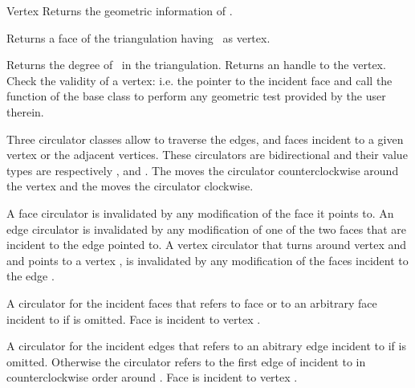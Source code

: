 \begin{ccRefClass}{Vertex}
\ccAccessFunctions
{}
{Returns  the geometric information of \ccVar.}

{Returns a face of the triangulation having  \ccVar\ as vertex.}

\begin{ccAdvanced}
\end{ccAdvanced}

{Returns the degree of \ccVar\ in the triangulation.}
\ccGlue
{}
{Returns an handle to the vertex.}
\ccGlue
{} 
{Check the validity of a vertex:
i.e. the pointer to the incident face  and call the 
function of the base class to perform any geometric test provided by the user
therein.}


Three circulator classes allow to traverse the edges, and faces
incident to a given vertex or  the adjacent vertices.
 These circulators are bidirectional
and their value types are respectively , 
and .
The   moves the circulator
counterclockwise around the vertex 
and  the  moves the circulator
clockwise. 

A face circulator is invalidated by any modification of the face it
points to. An edge circulator is invalidated
by any modification of one of the two faces that are incident to the edge
pointed to.  A vertex circulator that turns around vertex 
and and points  to a vertex , is invalidated
by any modification of the faces incident to the edge .




{A circulator for the  incident faces 
that refers to face  or to an arbitrary face
incident to   if  is omitted.
\ccPrecond Face  is incident to vertex .}

{A circulator for the incident edges that refers to an abitrary edge incident
to  if  is omitted. Otherwise the circulator refers
to the first edge of 
incident
to  in counterclockwise order around .
\ccPrecond Face  is incident to vertex . }


\end{ccRefClass}
